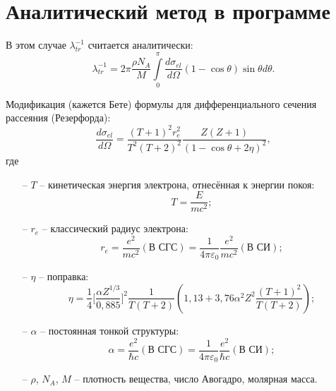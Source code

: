 \documentclass[a4paper,12pt]{article} %
\newcommand{\Dff}[2]{\frac{d #1}{d #2}}
\newcommand{\eps}{\varepsilon}
\begin{document}
\section{Аналитический метод в программе}

В этом случае $\lambda_{tr}^{-1}$ считается аналитически:
\begin{equation}\label{eq: ltr}
    \lambda_{tr}^{-1} =
    2 \pi \frac{\rho N_A}{M} \int\limits_{0}^{\pi}
    \Dff{\sigma_{el}}{\Omega} (1 - \cos \theta) \sin \theta d \theta.
\end{equation}

Модификация (кажется Бете) формулы для дифференциального сечения рассеяния (Резерфорда):
\begin{equation}
    \Dff{\sigma_{el}}{\Omega} =
    \frac{(T+1)^2 r_e^2}{T^2(T+2)^2} \frac{Z(Z+1)}{(1 - \cos \theta + 2 \eta)^2},
\end{equation}
где
\begin{itemize}
    \item[--] $T$ -- кинетическая энергия электрона, отнесённая к энергии покоя:
    \begin{equation}
        T = \frac{E}{mc^2};
    \end{equation}
    \item[--] $r_e$ -- классический радиус электрона:
    \begin{equation}
        r_e = \frac{e^2}{mc^2} (\text{В СГС}) = \frac{1}{4 \pi \eps_0}\frac{e^2}{mc^2} (\text{В СИ});
    \end{equation}
    \item[--] $\eta$ -- поправка:
    \begin{equation}
        \eta = \frac{1}{4}
        \Big[
            \frac{\alpha Z^{1/3}}{0{,}885}
        \Big]^2
        \frac{1}{T(T+2)} \left(1{,}13 + 3{,}76 \alpha^2 Z^2 \frac{(T+1)^2}{T(T+2)} \right);
    \end{equation}
    \item[--] $\alpha$ -- постоянная тонкой структуры:
    \begin{equation}
        \alpha = \frac{e^2}{\hbar c} (\text{В СГС}) = \frac{1}{4 \pi \eps_0} \frac{e^2}{\hbar c} (\text{В СИ});
    \end{equation}
    \item[--] $\rho$, $N_A$, $M$ -- плотность вещества, число Авогадро, молярная масса.
\end{itemize}
\end{document}
